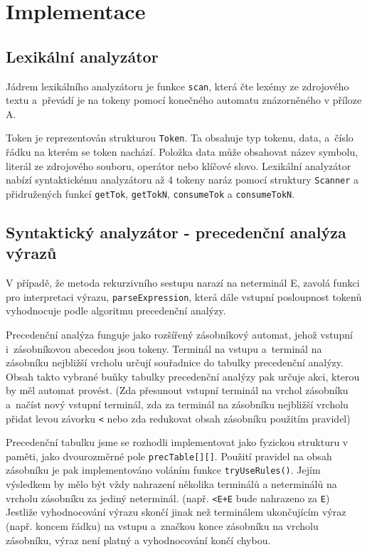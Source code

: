 \documentclass[12pt,a4paper,titlepage,final]{article}
\begin{document}
\section{Implementace} \label{implementace}
\subsection{Lexikální analyzátor}
Jádrem lexikálního analyzátoru je funkce \texttt{scan}, která čte lexémy ze zdrojového 
textu a~převádí je na tokeny pomocí konečného automatu znázorněného v příloze A.

Token je reprezentován strukturou \texttt{Token}. Ta obsahuje typ tokenu, data, a~číslo 
řádku na kterém se token nachází. Položka data může obsahovat název symbolu, literál ze 
zdrojového souboru, operátor nebo klíčové slovo. Lexikální analyzátor nabízí syntaktickému 
analyzátoru až 4 tokeny naráz pomocí struktury \texttt{Scanner} a přidružených funkcí
\texttt{getTok}, \texttt{getTokN}, \texttt{consumeTok} a \texttt{consumeTokN}.
\subsection{Syntaktický analyzátor - precedenční analýza výrazů}
V případě, že metoda rekurzivního sestupu narazí na neterminál E, zavolá funkci
pro interpretaci výrazu, \texttt{parseExpression}, která dále vstupní posloupnost
tokenů vyhodnocuje podle algoritmu precedenční analýzy.

Precedenční analýza funguje jako rozšířený zásobníkový automat, jehož vstupní 
i~zá\-so\-bní\-ko\-vou abecedou jsou tokeny. Terminál na vstupu a~terminál na zásobníku
nejbližší vrcholu určují souřadnice do tabulky precedenční analýzy.
Obsah takto vybrané buňky tabulky precedenční analýzy pak určuje akci, kterou
by měl automat provést. (Zda přesunout vstupní terminál na vrchol zásobníku a~načíst 
nový vstupní terminál, zda za terminál na zásobníku nejbližší vrcholu přidat
levou závorku \texttt{<} nebo zda redukovat obsah zásobníku použitím pravidel)

Precedenční tabulku jsme se rozhodli implementovat jako fyzickou strukturu v paměti,
jako dvourozměrné pole \texttt{precTable[][]}. Použití pravidel na obsah zásobníku je
pak implementováno voláním funkce \texttt{tryUseRules()}. Jejím výsledkem by mělo být
vždy nahrazení několika terminálů a neterminálů na vrcholu zásobníku za jediný
neterminál. (např. \texttt{<E+E} bude nahrazeno za \texttt{E}) Jestliže vyhodnocování
výrazu skončí jinak než terminálem ukončujícím výraz (např. koncem řádku) na vstupu 
a~značkou konce zásobníku na vrcholu zásobníku, výraz není platný a vyhodnocování
končí chybou.
\end{document}
